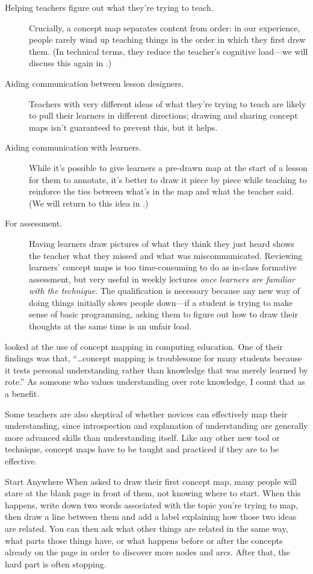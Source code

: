\begin{description}
\item[Helping teachers figure out what they're trying to teach.]
Crucially, a concept map separates content from order: in our
experience, people rarely wind up teaching things in the order in
which they first drew them. (In technical terms, they reduce the
teacher's cognitive load---we will discuss this again in
.)
\item[Aiding communication between lesson designers.]
Teachers with very different ideas of what they're trying to teach
are likely to pull their learners in different directions; drawing
and sharing concept maps isn't guaranteed to prevent this, but it
helps.
\item[Aiding communication with learners.]
While it's possible to give learners a pre-drawn map at the start of
a lesson for them to annotate, it's better to draw it piece by piece
while teaching to reinforce the ties between what's in the map and
what the teacher said. (We will return to this idea in
.)
\item[For assessment.]
Having learners draw pictures of what they think they just heard
shows the teacher what they missed and what was miscommunicated.
Reviewing learners' concept maps is too time-consuming to do as
in-class formative assessment, but very useful in weekly lectures
\emph{once learners are familiar with the technique}. The qualification
is necessary because any new way of doing things initially slows
people down---if a student is trying to make sense of basic
programming, asking them to figure out how to draw their thoughts at
the same time is an unfair load.
\end{description}

\cite{Kepp2008} looked at the use of concept mapping in computing
education. One of their findings was that, ``{\ldots}concept
mapping is troublesome for many students because it tests personal
understanding rather than knowledge that was merely learned by rote.'' As
someone who values understanding over rote knowledge, I count that as a
benefit.

Some teachers are also skeptical of whether novices can effectively map
their understanding, since introspection and explanation of
understanding are generally more advanced skills than understanding
itself. Like any other new tool or technique, concept maps have to be
taught and practiced if they are to be effective.

\begin{aside}{Start Anywhere}
  When asked to draw their first concept map, many people will stare at
  the blank page in front of them, not knowing where to start. When this
  happens, write down two words associated with the topic you're trying
  to map, then draw a line between them and add a label explaining how
  those two ideas are related. You can then ask what other things are
  related in the same way, what parts those things have, or what happens
  before or after the concepts already on the page in order to discover
  more nodes and arcs. After that, the hard part is often stopping.
\end{aside}

